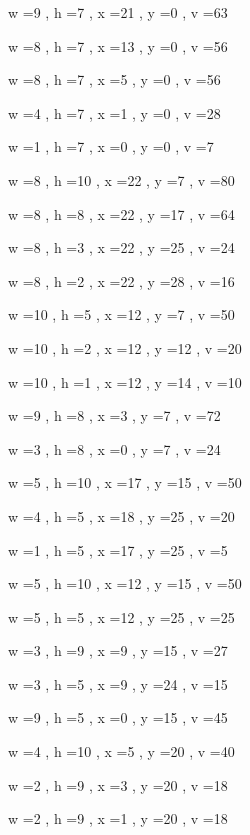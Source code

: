 \documentclass[11pt]{article}
\begin{document}


w =9 , h =7 , x =21 , y =0 , v =63
\par
w =8 , h =7 , x =13 , y =0 , v =56
\par
w =8 , h =7 , x =5 , y =0 , v =56
\par
w =4 , h =7 , x =1 , y =0 , v =28
\par
w =1 , h =7 , x =0 , y =0 , v =7
\par
w =8 , h =10 , x =22 , y =7 , v =80
\par
w =8 , h =8 , x =22 , y =17 , v =64
\par
w =8 , h =3 , x =22 , y =25 , v =24
\par
w =8 , h =2 , x =22 , y =28 , v =16
\par
w =10 , h =5 , x =12 , y =7 , v =50
\par
w =10 , h =2 , x =12 , y =12 , v =20
\par
w =10 , h =1 , x =12 , y =14 , v =10
\par
w =9 , h =8 , x =3 , y =7 , v =72
\par
w =3 , h =8 , x =0 , y =7 , v =24
\par
w =5 , h =10 , x =17 , y =15 , v =50
\par
w =4 , h =5 , x =18 , y =25 , v =20
\par
w =1 , h =5 , x =17 , y =25 , v =5
\par
w =5 , h =10 , x =12 , y =15 , v =50
\par
w =5 , h =5 , x =12 , y =25 , v =25
\par
w =3 , h =9 , x =9 , y =15 , v =27
\par
w =3 , h =5 , x =9 , y =24 , v =15
\par
w =9 , h =5 , x =0 , y =15 , v =45
\par
w =4 , h =10 , x =5 , y =20 , v =40
\par
w =2 , h =9 , x =3 , y =20 , v =18
\par
w =2 , h =9 , x =1 , y =20 , v =18
\par
\newpage
\end{document}
